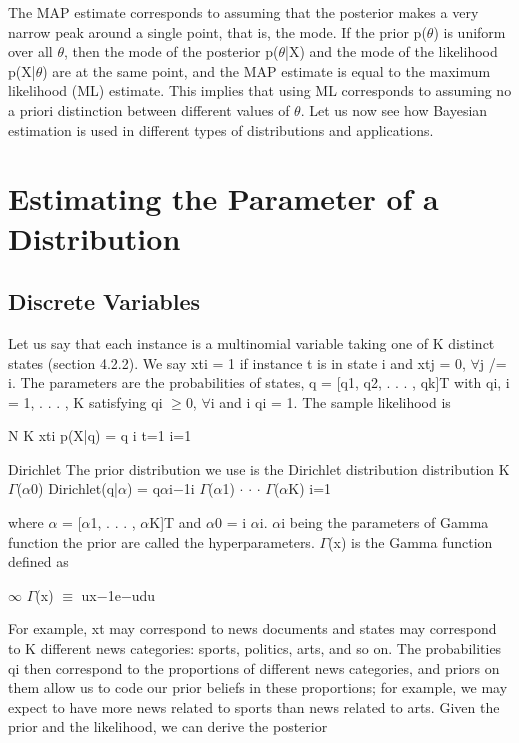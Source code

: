 The MAP estimate corresponds to assuming that the posterior makes a very narrow peak around a single point, that is, the mode. If the prior p($\theta$) is uniform over all $\theta$, then the mode of the posterior p($\theta$|X) and the mode of the likelihood p(X|$\theta$) are at the same point, and the MAP estimate is equal to the maximum likelihood (ML) estimate. This implies that using ML corresponds to assuming no a priori distinction between different values of $\theta$. Let us now see how Bayesian estimation is used in different types of distributions and applications.

\section{Estimating the Parameter of a Distribution}

\subsection{Discrete Variables}

Let us say that each instance is a multinomial variable taking one of K distinct states (section 4.2.2). We say xti = 1 if instance t is in state i and xtj = 0, $\forall$j /= i. The parameters are the probabilities of states, q = [q1, q2, . . . , qk]T with qi, i = 1, . . . , K satisfying qi $\geq$0, $\forall$i and i qi = 1. The sample likelihood is

N K xti p(X|q) = q i t=1 i=1

Dirichlet The prior distribution we use is the Dirichlet distribution distribution K $\Gamma$($\alpha$0) Dirichlet(q|$\alpha$) = q$\alpha$i$-$1i $\Gamma$($\alpha$1) $\cdot$ $\cdot$ $\cdot$ $\Gamma$($\alpha$K) i=1

where $\alpha$ = [$\alpha$1, . . . , $\alpha$K]T and $\alpha$0 = i $\alpha$i. $\alpha$i being the parameters of Gamma function the prior are called the hyperparameters. $\Gamma$(x) is the Gamma function defined as

$\infty$ $\Gamma$(x) $\equiv$ ux$-$1e$-$udu

For example, xt may correspond to news documents and states may correspond to K different news categories: sports, politics, arts, and so on. The probabilities qi then correspond to the proportions of different news categories, and priors on them allow us to code our prior beliefs in these proportions; for example, we may expect to have more news related to sports than news related to arts. Given the prior and the likelihood, we can derive the posterior

